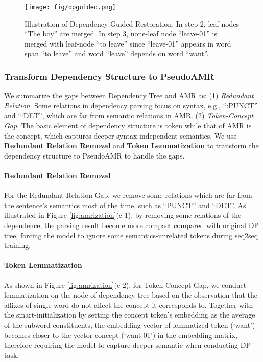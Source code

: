 \documentclass[11pt]{article}
\begin{document}
\begin{figure}[t]
    \centering
    \texttt{[image:  fig/dpguided.png]}
    \caption{Illustration of Dependency Guided Restoration. In step 2, leaf-nodes ``The boy'' are merged. In step 3, none-leaf node ``leave-01'' is merged with leaf-node ``to leave'' since ``leave-01'' appears in word span ``to leave'' and  word ``leave'' depends on word ``want''.}
    \label{fig:dpg}
\end{figure}




\subsubsection{Transform Dependency Structure to PseudoAMR} 
We summarize the gaps between Dependency Tree and AMR as:
(1) \textit{Redundant Relation}. Some relations in dependency parsing focus on syntax, e.g., 
``:PUNCT'' and ``:DET'', which are far from semantic relations in AMR. 
(2) \textit{Token-Concept Gap}. The basic element of dependency structure is token while that of AMR is the concept, which captures deeper syntax-independent semantics. 
We use \textbf{Redundant Relation Removal} and \textbf{Token Lemmatization} to transform the dependency structure to PseudoAMR to handle the gaps.


\paragraph{Redundant Relation Removal} 
For the Redundant Relation Gap, we remove some relations which are far from the sentence's semantics most of the time, such as ``PUNCT'' and ``DET''. As illustrated in Figure \ref{fig:amrization}(c-1), by removing some relations of the dependence, the parsing result become more compact compared with original DP tree, forcing the model to ignore some semantics-unrelated tokens during seq2seq training.


\paragraph{Token Lemmatization} 
As shown in Figure \ref{fig:amrization}(c-2),
for Token-Concept Gap, we conduct lemmatization on the node of dependency tree based on the observation that the affixes of single word do not affect the concept it corresponds to.  Together with the smart-initialization \citep{bevil-spring} by setting the concept token's embedding as the average of the subword constituents, the embedding vector of lemmatized token (`want') becomes closer to the vector concept (`want-01') in the embedding matrix, therefore requiring the model to capture deeper semantic when conducting DP task.
\end{document}
